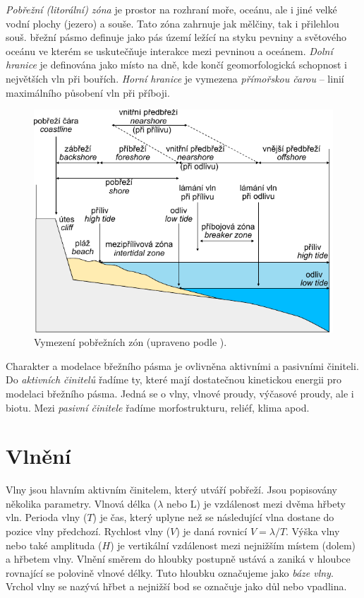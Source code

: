 \emph{Pobřežní (litorální) zóna} je prostor na rozhraní moře, oceánu, ale i jiné velké vodní plochy (jezero) a souše. Tato zóna zahrnuje jak mělčiny, tak i přilehlou souš. \textcite{demekObecnaGeomorfologie1987} břežní pásmo definuje jako pás území ležící na styku pevniny a světového oceánu ve kterém se uskutečňuje interakce mezi pevninou a oceánem. \emph{Dolní hranice} je definována jako místo na dně, kde končí geomorfologická schopnost i největších vln při bouřích. \emph{Horní hranice} je vymezena \emph{přímořskou čarou} -- linií maximálního působení vln při příboji. 

\begin{figure}[h]
	\centering
	\includegraphics[width=0.9\linewidth]{obrazky/marine/pobrezi}
	\caption{Vymezení pobřežních zón (upraveno podle \textcite{birdCoastalGeomorphologyIntroduction2008}).
		}
	\label{fig:pobrezi}
\end{figure}

Charakter a modelace břežního pásma je ovlivněna aktivními a pasivními činiteli. Do \emph{aktivních činitelů} řadíme ty, které mají dostatečnou kinetickou energii pro modelaci břežního pásma. Jedná se o vlny, vlnové proudy, výčasové proudy, ale i biotu. Mezi \emph{pasivní činitele} řadíme morfostrukturu, reliéf, klima apod. 

\section{Vlnění}
Vlny jsou hlavním aktivním činitelem, který utváří pobřeží. Jsou popisovány několika parametry. Vlnová délka ($\lambda$ nebo L) je vzdálenost mezi dvěma hřbety vln. Perioda vlny ($T$) je čas, který uplyne než se následující vlna dostane do pozice vlny předchozí. Rychlost vlny ($V$) je daná rovnicí $V = \lambda/T$.  Výška vlny nebo také amplituda ($H$) je vertikální vzdálenost mezi nejnižším místem (dolem) a hřbetem vlny. Vlnění směrem do hloubky postupně ustává a zaniká v hloubce rovnající se polovině vlnové délky. Tuto hloubku označujeme jako \emph{báze vlny}. Vrchol  vlny se nazývá hřbet a nejnižší bod se označuje jako důl nebo vpadlina. 

